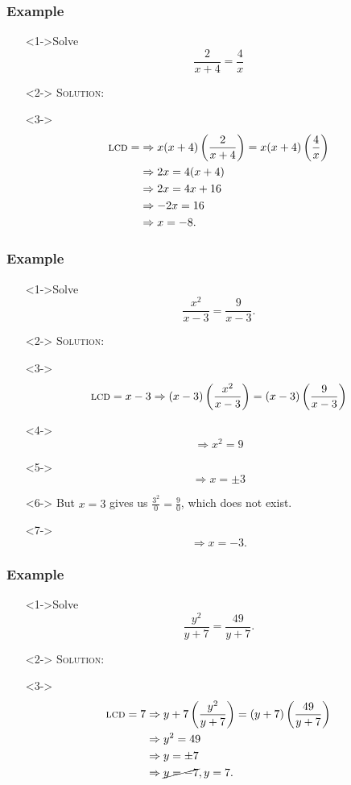 \documentclass[handout]{beamer}
\begin{document}
\begin{frame}
	\frametitle{Example}
	\begin{enumerate}
		\item[]<1->Solve
		\[
			\frac{2}{x+4}=\frac{4}{x}
		\]
		\item[]<2-> \textsc{Solution:}
		\item[]<3->
		\begin{align*}
			\text{\textsc{lcd}}= & \Rightarrow x(x+4) \left( \frac{2}{x+4}\right)=x(x+4) \left( \frac{4}{x} \right) \\
			& \Rightarrow 2x=4(x+4) \\
			& \Rightarrow 2x=4x+16 \\
			& \Rightarrow -2x=16 \\
			& \Rightarrow x=-8.
		\end{align*}
	\end{enumerate}
\end{frame}

\begin{frame}
	\frametitle{Example}
	\begin{enumerate}
		\item[]<1->Solve \[ \frac{x^{2}}{x-3}=\frac{9}{x-3}. \]
		\item[]<2-> \textsc{Solution:}
		\item[]<3-> \[ \text{\textsc{lcd}}=x-3 \Rightarrow (x-3) \left( \frac{x^{2}}{x-3} \right)=(x-3) \left( \frac{9}{x-3}\right)\]
		\item[]<4-> \[\Rightarrow  x^{2}=9 \]
		\item[]<5->\[ \Rightarrow x=\pm 3 \]
		\item[]<6-> But $x=3$ gives us $\frac{3^{2}}{0}=\frac{9}{0}$, which does not exist.
		\item[]<7-> \[ \Rightarrow x=-3. \]
	\end{enumerate}
\end{frame}

\begin{frame}
	\frametitle{Example}
	\begin{enumerate}
		\item[]<1->Solve
		\[
			\frac{y^{2}}{y+7}=\frac{49}{y+7}.
		\]
		\item[]<2-> \textsc{Solution:}
		\item[]<3->
		\begin{align*}
			\text{\textsc{lcd}}=7 & \Rightarrow y+7 \left( \frac{y^{2}}{y+7}\right)=(y+7) \left( \frac{49}{y+7}\right)  \\
			& \Rightarrow y^{2}=49 \\
			& \Rightarrow y= \pm 7 \\
			& \Rightarrow \cancel{y=-7}, y=7.
		\end{align*}
	\end{enumerate}
\end{frame}
\end{document}
